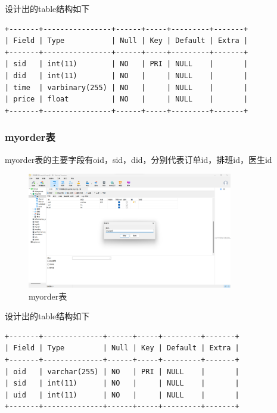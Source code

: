 \documentclass[UTF8,12pt]{article}
\begin{document}
设计出的table结构如下

\begin{lstlisting}[frame=shadowbox]
+-------+----------------+------+-----+---------+-------+
| Field | Type           | Null | Key | Default | Extra |
+-------+----------------+------+-----+---------+-------+
| sid   | int(11)        | NO   | PRI | NULL    |       |
| did   | int(11)        | NO   |     | NULL    |       |
| time  | varbinary(255) | NO   |     | NULL    |       |
| price | float          | NO   |     | NULL    |       |
+-------+----------------+------+-----+---------+-------+
\end{lstlisting}

\subsubsection{myorder表}

myorder表的主要字段有oid，sid，did，分别代表订单id，排班id，医生id

\newpage

\begin{figure}[htbp]
    \centering
    \includegraphics[width=0.8\textwidth]{imgs/9.png}
    \caption{myorder表}
\end{figure}

设计出的table结构如下

\begin{lstlisting}[frame=shadowbox]
+-------+--------------+------+-----+---------+-------+
| Field | Type         | Null | Key | Default | Extra |
+-------+--------------+------+-----+---------+-------+
| oid   | varchar(255) | NO   | PRI | NULL    |       |
| sid   | int(11)      | NO   |     | NULL    |       |
| uid   | int(11)      | NO   |     | NULL    |       |
+-------+--------------+------+-----+---------+-------+
\end{lstlisting}

\newpage
\end{document}
